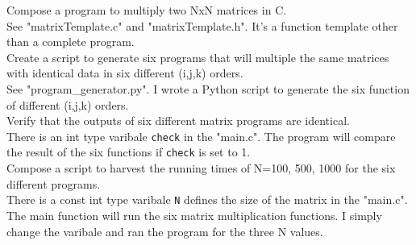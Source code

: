 \documentclass{article}
\begin{document}
Compose a program to multiply two NxN matrices in C.\\
\indent See "matrixTemplate.c" and "matrixTemplate.h". It's a function template other than a complete program.\\

Create a script to generate six programs that will multiple the same matrices with identical data in six different (i,j,k) orders.\\
\indent See "program\_generator.py". I wrote a Python script to generate the six function of different (i,j,k) orders.\\

Verify that the outputs of six different matrix programs are identical.\\
\indent There is an int type varibale \texttt{check} in the "main.c". The program will compare the result of the six functions if \texttt{check} is set to 1.\\

Compose a script to harvest the running times of N=100, 500, 1000 for the six different programs.\\
\indent There is a const int type varibale \texttt{N} defines the size of the matrix in the "main.c". The main function will run the six matrix multiplication functions. I simply change the varibale and ran the program for the three N values.\\
\end{document}
